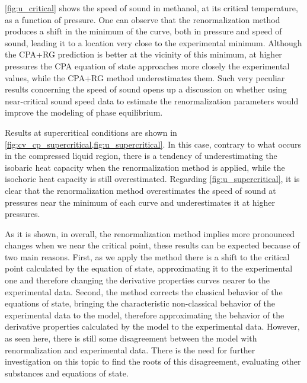 \documentclass[preprint,12pt,3p]{elsarticle}
\begin{document}
\cref{fig:u_critical} shows the speed of sound in methanol, at its critical temperature, as a function of pressure.
One can observe that the renormalization method produces a shift in the minimum of the curve, both in pressure and speed of sound, leading it to a location very close to the experimental minimum.
Although the CPA+RG prediction is better at the vicinity of this minimum, at higher pressures the CPA equation of state approaches more closely the experimental values, while the CPA+RG method underestimates them.
Such very peculiar results concerning the speed of sound opens up a discussion on whether using  near-critical sound speed data to estimate the renormalization parameters would improve the modeling of phase equilibrium.

Results at supercritical conditions are shown in \cref{fig:cv_cp_supercritical,fig:u_supercritical}.
In this case, contrary to what occurs in the compressed liquid region, there is a tendency of underestimating the isobaric heat capacity when the renormalization method is applied, while the isochoric heat capacity is still overestimated.
Regarding \cref{fig:u_supercritical}, it is clear that the renormalization method overestimates the speed of sound at pressures near the minimum of each curve and underestimates it at higher pressures.

As it is shown, in overall, the renormalization method implies more pronounced changes when we near the critical point, these results can be expected because of two main reasons. First, as we apply the method there is a shift to the critical point calculated by the equation of state, approximating it to the experimental one and therefore changing the derivative properties curves nearer to the experimental data. Second, the method corrects the classical behavior of the equations of state, bringing the characteristic non-classical behavior of the experimental data to the model, therefore approximating the behavior of the derivative properties calculated by the model to the experimental data. However, as seen here, there is still some disagreement between the model with renormalization and experimental data.
There is the need for further investigation on this topic to find the roots of this disagreement, evaluating other substances and equations of state.
\end{document}
